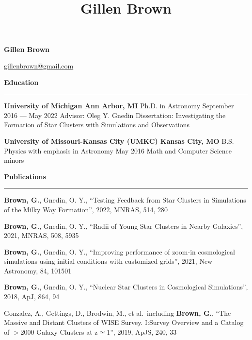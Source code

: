 \documentclass[10pt]{article}
\title{Gillen Brown}
\newcommand{\header}[1]{\vspace{2em}\par \textbf{\large #1}\strut\hrule\vspace{0em}}
\newcommand{\actionHeader}[2]{\textbf{#1 \hfill #2}}
\newcommand{\indentedItemDate}[2]{\newline\null\qquad #1 \hfill #2}
\newcommand{\indentedItem}[1]{\newline\null\qquad #1}
\begin{document}
\thispagestyle{empty}


\begin{center}
{\huge \bf Gillen Brown}

\href{mailto:gillenbrown@gmail.com}{gillenbrown@gmail.com} 
\end{center}
\bigskip



\header{Education}
\actionHeader{University of Michigan}{Ann Arbor, MI}
\indentedItemDate{Ph.D. in Astronomy}{September 2016 --- May 2022}
\indentedItem{Advisor: Oleg Y. Gnedin} 
\indentedItem{Dissertation: Investigating the Formation of Star Clusters with Simulations and Observations}

\actionHeader{University of Missouri-Kansas City (UMKC)}{Kansas City, MO}
\indentedItemDate{B.S. Physics with emphasis in Astronomy}{May 2016}
\indentedItem{Math and Computer Science minors}

\header{Publications}
\begin{etaremune}
    \item \textbf{Brown, G.}, Gnedin, O. Y., ``Testing Feedback from Star Clusters in Simulations of the Milky Way Formation'', 2022, MNRAS, 514, 280 
    \item \textbf{Brown, G.}, Gnedin, O. Y.,  ``Radii of Young Star Clusters in Nearby Galaxies'', 2021, MNRAS, 508, 5935
    \item \textbf{Brown, G.}, Gnedin, O. Y.,  ``Improving performance of zoom-in cosmological simulations using initial conditions with customized grids'', 2021, New Astronomy, 84, 101501
    \item \textbf{Brown, G.}, Gnedin, O. Y.,  ``Nuclear Star Clusters in Cosmological Simulations'', 2018, ApJ, 864, 94
    \item Gonzalez, A., Gettings, D., Brodwin, M., et al.\ including \textbf{Brown, G.}, ``The Massive and Distant Clusters of WISE Survey. I:\@ Survey Overview and a Catalog of $>$2000 Galaxy Clusters at z$\simeq$1'', 2019, ApJS, 240, 33
\end{etaremune}
\end{document}
